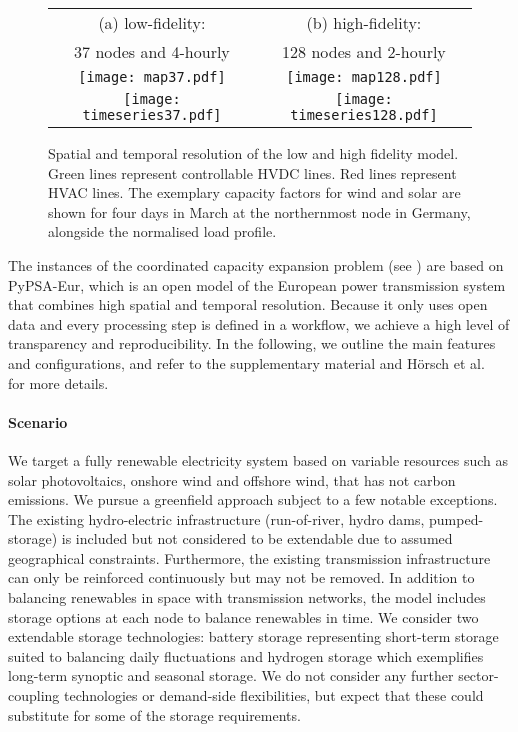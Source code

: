 
\begin{figure}
    \centering
        \begin{tabular}{cc}
            \footnotesize (a) low-fidelity: & \footnotesize (b) high-fidelity: \\
            \footnotesize 37 nodes and 4-hourly & \footnotesize 128 nodes and 2-hourly \\
            \texttt{[image: map37.pdf]} &
            \texttt{[image: map128.pdf]} \\
            \texttt{[image: timeseries37.pdf]} &
            \texttt{[image: timeseries128.pdf]} \\
        \end{tabular}
    \caption[Spatial and temporal resolution of the low and high fidelity model]{Spatial and temporal resolution of the low and high fidelity model.
    Green lines represent controllable HVDC lines. Red lines represent HVAC lines.
    The exemplary capacity factors for wind and solar are shown for four days in March
    at the northernmost node in Germany, alongside the normalised load profile.}
    \label{fig:pypsaeur}
\end{figure}


The instances of the coordinated capacity expansion problem
 (see ) are based on \mbox{PyPSA-Eur}, which is an open model of
 the European power transmission system that combines high spatial and temporal
 resolution.\cite{pypsaeur} Because it only uses open data and every processing
 step is defined in a workflow,\cite{snakemake} we achieve a high level of
 transparency and reproducibility. In the following, we outline the main
 features and configurations, and refer to the supplementary material and Hörsch
 et al.~\cite{pypsaeur} for more details.

\paragraph{Scenario}
We target a fully renewable electricity system based on variable resources such
as solar photovoltaics, onshore wind and offshore wind, that has not carbon
emissions. We pursue a greenfield approach subject to a few notable exceptions.
The existing hydro-electric infrastructure (run-of-river, hydro dams,
pumped-storage) is included but not considered to be extendable due to assumed
geographical constraints. Furthermore, the existing transmission infrastructure
can only be reinforced continuously but may not be removed. In addition to
balancing renewables in space with transmission networks, the model includes
storage options at each node to balance renewables in time. We consider two
extendable storage technologies: battery storage representing short-term storage
suited to balancing daily fluctuations and hydrogen storage which exemplifies
long-term synoptic and seasonal storage. We do not consider any further
sector-coupling technologies or demand-side flexibilities, but expect that these
could substitute for some of the storage requirements.

